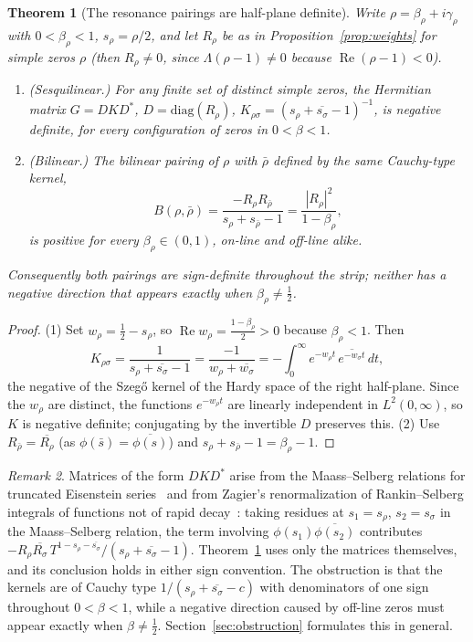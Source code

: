 \documentclass[11pt]{amsart}
\newtheorem{theorem}{Theorem}[section]
\theoremstyle{definition}
\theoremstyle{remark}
\newtheorem{remark}[theorem]{Remark}
\renewcommand{\Re}{\operatorname{Re}}
\newcommand{\half}{\tfrac12}
\begin{document}
\begin{theorem}[The resonance pairings are half-plane definite]\label{thm:modular}
Write $\rho=\beta_\rho+i\gamma_\rho$ with $0<\beta_\rho<1$, $s_\rho=\rho/2$, and let $R_\rho$ be
as in Proposition~\ref{prop:weights} for simple zeros $\rho$ (then $R_\rho\neq0$, since
$\Lambda(\rho-1)\neq0$ because $\Re(\rho-1)<0$).
\begin{enumerate}
\item \emph{(Sesquilinear.)} For any finite set of distinct simple zeros, the Hermitian matrix $G=DKD^{*}$,
$D=\mathrm{diag}(R_\rho)$, $K_{\rho\sigma}=(s_\rho+\overline{s_\sigma}-1)^{-1}$, is
negative definite, for every configuration of zeros in $0<\beta<1$.
\item \emph{(Bilinear.)} The bilinear pairing of $\rho$ with $\bar\rho$ defined by the same
Cauchy-type kernel,
\[
B(\rho,\bar\rho)=\frac{-R_\rho R_{\bar\rho}}{s_\rho+s_{\bar\rho}-1}
=\frac{|R_\rho|^2}{1-\beta_\rho},
\]
is positive for every $\beta_\rho\in(0,1)$, on-line and off-line alike.
\end{enumerate}
Consequently both pairings are sign-definite throughout the strip; neither has a negative
direction that appears exactly when $\beta_\rho\neq\half$.
\end{theorem}
\begin{proof}
(1) Set $w_\rho=\half-s_\rho$, so $\Re w_\rho=\tfrac{1-\beta_\rho}{2}>0$ because
$\beta_\rho<1$. Then
\[
K_{\rho\sigma}=\frac{1}{s_\rho+\overline{s_\sigma}-1}=\frac{-1}{w_\rho+\overline{w_\sigma}}
=-\int_0^\infty e^{-w_\rho t}\,\overline{e^{-w_\sigma t}}\,dt,
\]
the negative of the Szeg\H o kernel of the Hardy space of the right half-plane. Since the
$w_\rho$ are distinct, the functions $e^{-w_\rho t}$ are linearly independent in
$L^2(0,\infty)$, so $K$ is negative definite; conjugating by the invertible $D$ preserves this.
(2) Use $R_{\bar\rho}=\overline{R_\rho}$ (as $\phi(\bar s)=\overline{\phi(s)}$) and
$s_\rho+s_{\bar\rho}-1=\beta_\rho-1$.
\end{proof}

\begin{remark}
Matrices of the form $DKD^*$ arise from the Maass--Selberg relations for truncated Eisenstein
series~\cite[Ch.~6]{Iwaniec} and from Zagier's renormalization of Rankin--Selberg integrals of
functions not of rapid decay~\cite{Zagier}: taking residues at $s_1=s_\rho$, $s_2=s_\sigma$ in
the Maass--Selberg relation, the term involving $\phi(s_1)\overline{\phi(s_2)}$ contributes
$-R_\rho\overline{R_\sigma}\,T^{1-s_\rho-\overline{s_\sigma}}/(s_\rho+\overline{s_\sigma}-1)$.
Theorem~\ref{thm:modular} uses only the matrices themselves, and its conclusion holds in either
sign convention. The obstruction is that the kernels are of Cauchy type
$1/(s_\rho+\overline{s_\sigma}-c)$ with denominators of one sign throughout $0<\beta<1$, while a
negative direction caused by off-line zeros must appear exactly when $\beta\neq\half$.
Section~\ref{sec:obstruction} formulates this in general.
\end{remark}
\end{document}
